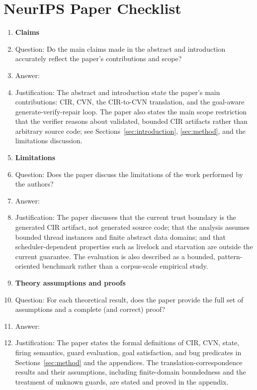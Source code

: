 \section*{NeurIPS Paper Checklist}

\begin{enumerate}

\item {\bf Claims}
    \item[] Question: Do the main claims made in the abstract and introduction accurately reflect the paper's contributions and scope?
    \item[] Answer: \answerYes{}
    \item[] Justification: The abstract and introduction state the paper's main contributions: CIR, CVN, the CIR-to-CVN translation, and the goal-aware generate-verify-repair loop. The paper also states the main scope restriction that the verifier reasons about validated, bounded CIR artifacts rather than arbitrary source code; see Sections~\ref{sec:introduction}, \ref{sec:method}, and the limitations discussion.

\item {\bf Limitations}
    \item[] Question: Does the paper discuss the limitations of the work performed by the authors?
    \item[] Answer: \answerYes{}
    \item[] Justification: The paper discusses that the current trust boundary is the generated CIR artifact, not generated source code; that the analysis assumes bounded thread instances and finite abstract data domains; and that scheduler-dependent properties such as livelock and starvation are outside the current guarantee. The evaluation is also described as a bounded, pattern-oriented benchmark rather than a corpus-scale empirical study.

\item {\bf Theory assumptions and proofs}
    \item[] Question: For each theoretical result, does the paper provide the full set of assumptions and a complete (and correct) proof?
    \item[] Answer: \answerYes{}
    \item[] Justification: The paper states the formal definitions of CIR, CVN, state, firing semantics, guard evaluation, goal satisfaction, and bug predicates in Sections~\ref{sec:method} and the appendices. The translation-correspondence results and their assumptions, including finite-domain boundedness and the treatment of unknown guards, are stated and proved in the appendix.


\end{enumerate}
